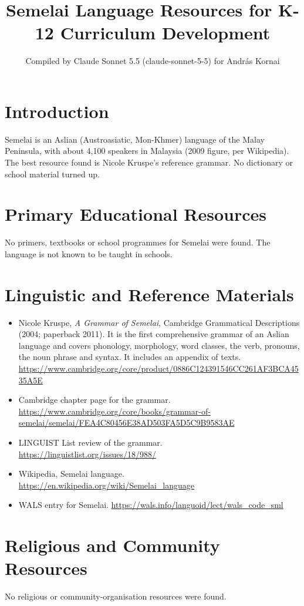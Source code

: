 \documentclass[12pt]{article}
\title{Semelai Language Resources for K-12 Curriculum Development}
\author{Compiled by Claude Sonnet 5.5 (claude-sonnet-5-5) for Andr\'as Kornai}
\date{}
\begin{document}
\maketitle

\section{Introduction}
Semelai is an Aslian (Austroasiatic, Mon-Khmer) language of the Malay Peninsula, with about 4,100 speakers in Malaysia (2009 figure, per Wikipedia). The best resource found is Nicole Kruspe's reference grammar. No dictionary or school material turned up.

\section{Primary Educational Resources}
No primers, textbooks or school programmes for Semelai were found. The language is not known to be taught in schools.

\section{Linguistic and Reference Materials}
\begin{itemize}
\item Nicole Kruspe, \emph{A Grammar of Semelai}, Cambridge Grammatical Descriptions (2004; paperback 2011). It is the first comprehensive grammar of an Aslian language and covers phonology, morphology, word classes, the verb, pronouns, the noun phrase and syntax. It includes an appendix of texts. \url{https://www.cambridge.org/core/product/0886C124391546CC261AF3BCA4535A5E}
\item Cambridge chapter page for the grammar. \url{https://www.cambridge.org/core/books/grammar-of-semelai/semelai/FEA4C80456E38AD503FA5D5C9B9583AE}
\item LINGUIST List review of the grammar. \url{https://linguistlist.org/issues/18/988/}
\item Wikipedia, Semelai language. \url{https://en.wikipedia.org/wiki/Semelai_language}
\item WALS entry for Semelai. \url{https://wals.info/languoid/lect/wals_code_sml}
\end{itemize}

\section{Religious and Community Resources}
No religious or community-organisation resources were found.
\end{document}

